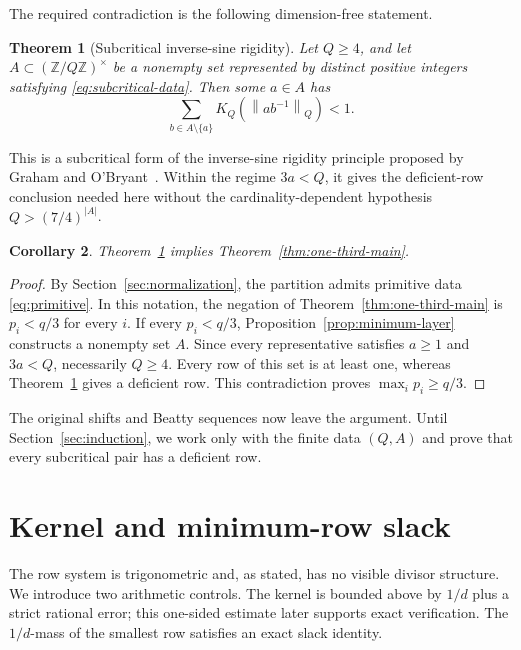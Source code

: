 \documentclass[11pt]{article}
\newtheorem{theorem}{Theorem}[section]
\newtheorem{corollary}[theorem]{Corollary}
\theoremstyle{definition}
\theoremstyle{remark}
\newcommand{\U}{(\mathbb Z/Q\mathbb Z)^\times}
\newcommand{\normQ}[1]{\left\lVert #1\right\rVert_Q}
\begin{document}
The required contradiction is the following dimension-free statement.

\begin{theorem}[Subcritical inverse-sine rigidity]\label{thm:SC}
Let \(Q\ge4\), and let \(A\subset\U\) be a nonempty set represented by
distinct positive integers satisfying \eqref{eq:subcritical-data}.  Then some \(a\in A\)
has
\begin{equation}\label{eq:SC}
 \sum_{b\in A\setminus\{a\}}
 K_Q\!\left(\normQ{ab^{-1}}\right)<1.
\end{equation}
\end{theorem}

This is a subcritical form of the inverse-sine rigidity principle proposed by
Graham and O'Bryant~\cite[Conjecture~5.2]{GrahamOBryant2005}.  Within the
regime \(3a<Q\), it gives the deficient-row conclusion needed here without
the cardinality-dependent hypothesis \(Q>(7/4)^{|A|}\).

\begin{corollary}\label{cor:one-third}
Theorem~\ref{thm:SC} implies Theorem~\ref{thm:one-third-main}.
\end{corollary}

\begin{proof}
By Section~\ref{sec:normalization}, the partition admits primitive data
\eqref{eq:primitive}.  In this notation, the negation of
Theorem~\ref{thm:one-third-main} is \(p_i<q/3\) for every \(i\).
If every \(p_i<q/3\), Proposition~\ref{prop:minimum-layer} constructs a
nonempty set \(A\).  Since every representative satisfies \(a\ge1\) and
\(3a<Q\), necessarily \(Q\ge4\).  Every row of this set is at least one,
whereas
Theorem~\ref{thm:SC} gives a deficient row.  This contradiction proves
\(\max_i p_i\ge q/3\).
\end{proof}

The original shifts and Beatty sequences now leave the argument.  Until
Section~\ref{sec:induction}, we work only with the finite data \((Q,A)\) and
prove that every subcritical pair has a deficient row.

\section{Kernel and minimum-row slack}\label{sec:slack}

The row system is trigonometric and, as stated, has no visible divisor
structure.  We introduce two arithmetic controls.  The kernel is bounded
above by \(1/d\) plus a strict rational error; this one-sided estimate later
supports exact verification.  The \(1/d\)-mass of the smallest row satisfies
an exact slack identity.
\end{document}
